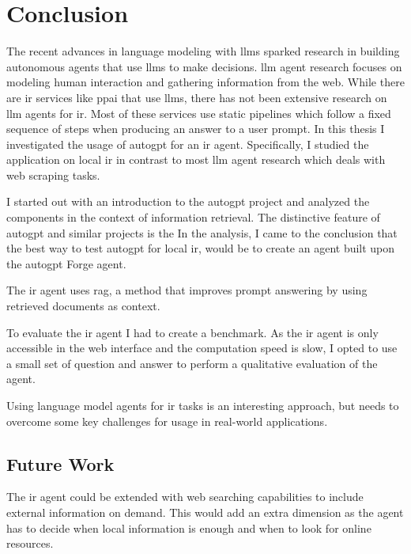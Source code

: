 \documentclass[../main.tex]{subfiles}
\begin{document}
\chapter{Conclusion}
\label{ch:conclusion}
\glsresetall
The recent advances in language modeling with \glspl{llm} sparked research
in building autonomous agents that use \glspl{llm} to make decisions.
\Gls{llm} agent research focuses on modeling human interaction and gathering
information from the web. %
While there are \gls{ir} services like \gls{ppai} that use \glspl{llm}, there has not been
extensive research on \gls{llm} agents for \gls{ir}.
Most of these services use static pipelines which follow a fixed sequence of
steps when producing an answer to a user prompt.
In this thesis I investigated the usage of \gls{autogpt} for an \gls{ir} agent.
Specifically, I studied the application on local \gls{ir} in contrast to most \gls{llm}
agent research which deals with web scraping tasks.

I started out with an introduction to the \gls{autogpt} project and analyzed
the components in the context of information retrieval.
The distinctive feature of \gls{autogpt} and similar projects is the
In the analysis, I came to the conclusion that the best way to test \gls{autogpt}
for local \gls{ir}, would be to create an agent built upon the \gls{autogpt}
Forge agent.

The \gls{ir} agent uses \gls{rag}, a method that improves prompt answering
by using retrieved documents as context.

To evaluate the \gls{ir} agent I had to create a benchmark.
As the \gls{ir} agent is only accessible in the web interface and
the computation speed is slow, I opted to use a small set of question and answer
to perform a qualitative evaluation of the agent.

Using language model agents for \gls{ir} tasks is an interesting approach,
but needs to overcome some key challenges for usage in real-world applications.

\section{Future Work}

The \gls{ir} agent could be extended with web searching capabilities
to include external information on demand.
This would add an extra dimension as the agent has to decide when local information
is enough and when to look for online resources.
\end{document}
